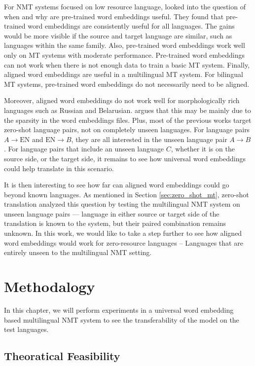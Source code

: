 \documentclass[thesis,fonts=libertine]{cluu}
\begin{document}
For NMT systems focused on low resource language, \textcite{Qi:2018aa} looked into the question of when and why are pre-trained word embeddings useful. They found that pre-trained word embeddings are consistently useful for all languages. The gains would be more visible if the source and target language are similar, such as languages within the same family. Also, pre-trained word embeddings work well only on MT systems with moderate performance. Pre-trained word embeddings can not work when there is not enough data to train a basic MT system. Finally, aligned word embeddings are useful in a multilingual MT system. For bilingual MT systems, pre-trained word embeddings do not necessarily need to be aligned.

Moreover, aligned word embeddings do not work well for morphologically rich languages such as Russian and Belarusian. \textcite{Qi:2018aa} argues that this may be mainly due to the sparsity in the word embeddings files. Plus, most of the previous works target zero-shot language pairs, not on completely unseen languages. For language pairs $A \rightarrow \text{EN}$ and $\text{EN} \rightarrow B$, they are all interested in the unseen language pair $A \rightarrow B$. For language pairs that include an unseen language $C$, whether it is on the source side, or the target side, it remains to see how universal word embeddings could help translate in this scenario.

It is then interesting to see how far can aligned word embeddings could go beyond known languages. As mentioned in Section \ref{sec:zero_shot_mt}, zero-shot translation analyzed this question by testing the multilingual NMT system on unseen language pairs --- language in either source or target side of the translation is known to the system, but their paired combination remains unknown. In this work, we would like to take a step further to see how aligned word embeddings would work for zero-resource languages -- Languages that are entirely unseen to the multilingual NMT setting.

\chapter{Methodalogy}
\label{chap:method}

In this chapter, we will perform experiments in a universal word embedding based multilingual NMT system to see the transferability of the model on the test languages.

\section{Theoratical Feasibility}
\end{document}
